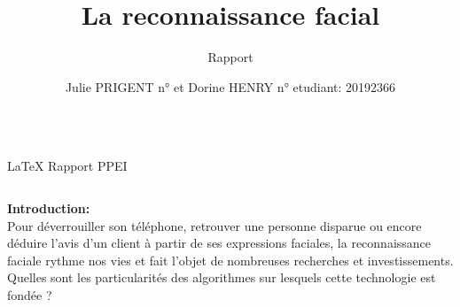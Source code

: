 \documentclass{beamer}
\title[Rapport]{La reconnaissance facial}
\subtitle[\ldots]{Rapport}
\author{Julie PRIGENT n° et Dorine HENRY n° etudiant: 20192366}
\institute[Evry]{Evry Val d'Essonne}
\begin{document}
 
\begin{columns}[c]
    \begin{column}{0.5\textwidth}
    \color{blancCreme}
\hrulefill 
   \Huge{ LaTeX \quad {} \hrulefill Rapport PPEI } \par
   	\hrulefill
    \end{column}
\end{columns}

\begin{columns}[c]	 
	\begin{column}{0.5\textwidth}
	\color{blancCreme}
  	 {\bf Introduction:} \\
Pour déverrouiller son téléphone, retrouver une personne disparue ou encore déduire l’avis d’un client à partir de ses expressions faciales, la reconnaissance faciale rythme nos vies et fait l’objet de nombreuses recherches et investissements.\\ Quelles sont les particularités des algorithmes sur lesquels cette technologie est fondée ? \par
	\hrulefill
	\end{column}
\end{columns}
	
\end{document}
